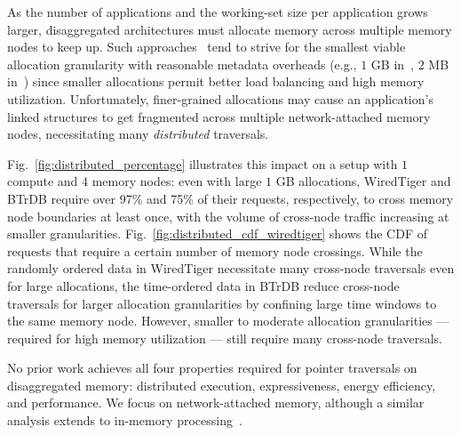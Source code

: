  As the number of applications and the working-set size per application grows larger, disaggregated architectures must allocate memory across multiple memory nodes to keep up. Such approaches~\cite{legoos, mind, infiniswap, fastswap} tend to strive for the smallest viable allocation granularity with reasonable metadata overheads (e.g., $1$ GB in~\cite{legoos}, $2$ MB in~\cite{mind}) since smaller allocations permit better load balancing and high memory utilization. Unfortunately, finer-grained allocations may cause an application's linked structures to get fragmented across multiple network-attached memory nodes, necessitating many \emph{distributed} traversals. 

Fig.~\ref{fig:distributed_percentage} illustrates this impact on a setup with $1$ compute and $4$ memory nodes: even with large $1$ GB allocations, WiredTiger and BTrDB require over 97\% and 75\% of their requests, respectively, to cross memory node boundaries at least once, with the volume of cross-node traffic increasing at smaller granularities. Fig.~\ref{fig:distributed_cdf_wiredtiger} shows the CDF of requests that require a certain number of memory node crossings. While the randomly ordered data in WiredTiger necessitate many cross-node traversals even for large allocations, the time-ordered data in BTrDB reduce cross-node traversals for larger allocation granularities by confining large time windows to the same memory node. However, smaller to moderate allocation granularities --- required for high memory utilization --- still require many cross-node traversals. 




No prior work achieves all four properties required for pointer traversals on disaggregated memory: distributed execution, expressiveness, energy efficiency, and performance. We focus on network-attached memory, although a similar analysis extends to in-memory processing~\cite{walkers, ahn2015scalable, impica, asghari2016chameleon, chi2016prime, seshadri2017simple, dai2018graphh, schuiki2018scalable, mutlu2019processing, kwon2019_TensorDIMM, boroumand2019_codna, gu2020ipim, lockerman2020livia, cho2020_data, ke2020_RecNMP, wang2021stream, xie2021spacea, ke2021near, singh2021fpga, olgun2022pidram, mutlu2022modern, oliveira2022accelerating, eckert2022eidetic, tu2022redcim, dai2022dimmining, devic2022_PIM, wang2022_Nearstream, gomez2023evaluating, xie2023mpu}.
 

